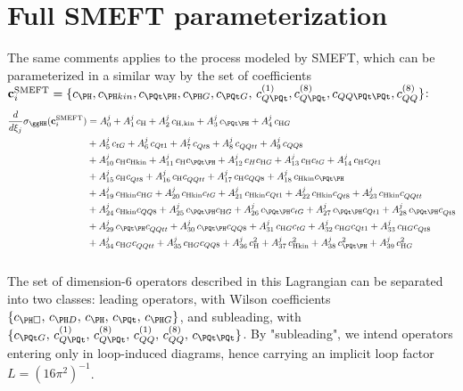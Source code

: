 \section{Full SMEFT parameterization}
\label{sec:appendix_smeft_parameterization}

The same comments applies to the \ggHH process modeled by SMEFT, which can be parameterized in a similar way by the set of coefficients $\mathbf{c}^{\text{SMEFT}}_i=\{c_\PH,c_{\PH kin},c_{\PQt\PH}, c_{\PH G},  c_{\PQt G},\,c_{Q\PQt}^{(1)},c_{Q\PQt}^{(8)},c_{QQ\PQt\PQt},c_{QQ}^{(8)}\}$:
\begin{align}\label{smeftparams}
\notag\frac{d}{d\xi_j}\sigma_{\ggHH}(\mathbf{c}^{\text{SMEFT}}_i)&= A^j_0 + A^j_1\,c_{\text{H}} + A^j_2\,c_{\text{H},\mathrm{kin}} + A^j_3\,c_{\PQt\PH} + A^j_4\,c_{\text{H}G}\\\notag
& + A^j_5\,c_{tG} + A^j_6\,c_{Qt1} + A^j_7\,c_{Qt8}^{} + A^j_8\,c_{QQtt}^{} + A^j_9\,c_{QQ8}\\\notag
& + A^j_{10}\,c_\text{H} c_{\text{H}\mathrm{kin}} + A^j_{11}\,c_\text{H} c_{\PQt\PH} + A^j_{12}\,c_H c_{\text{H}G} + A^j_{13}\,c_\text{H} c_{tG} + A^j_{14}\,c_\text{H} c_{Qt1}\\
& + A^j_{15}\,c_\text{H} c_{Qt8}^{} + A^j_{16}\,c_\text{H} c_{QQtt}^{} + A^j_{17}\,c_\text{H} c_{QQ8} + A^j_{18}\,c_{\text{H}\mathrm{kin}} c_{\PQt\PH}\\\notag
& + A^j_{19}\,c_{\text{H}\mathrm{kin}} c_{\text{H}G} + A^j_{20}\,c_{\text{H}\mathrm{kin}} c_{tG} + A^j_{21}\,c_{\text{H}\mathrm{kin}} c_{Qt1} + A^j_{22}\,c_{\text{H}\mathrm{kin}} c_{Qt8}^{} + A^j_{23}\,c_{\text{H}\mathrm{kin}} c_{QQtt}^{}\\\notag
& + A^j_{24}\,c_{\text{H}\mathrm{kin}} c_{QQ8} + A^j_{25}\,c_{\PQt\PH} c_{\text{H}G} + A^j_{26}\,c_{\PQt\PH} c_{tG} + A^j_{27}\,c_{\PQt\PH} c_{Qt1} + A^j_{28}\,c_{\PQt\PH} c_{Qt8}^{}\\\notag
& + A^j_{29}\,c_{\PQt\PH} c_{QQtt}^{} + A^j_{30}\,c_{\PQt\PH} c_{QQ8} + A^j_{31}\,c_{\text{H}G} c_{tG} + A^j_{32}\,c_{\text{H}G} c_{Qt1} + A^j_{33}\,c_{\text{H}G} c_{Qt8}^{}\\\notag
& + A^j_{34}\,c_{\text{H}G} c_{QQtt}^{} + A^j_{35}\,c_{\text{H}G} c_{QQ8} + A^j_{36}\,c_\text{H}^2 + A^j_{37}\,c_{\text{H}\mathrm{kin}}^2 + A^j_{38}\,c_{\PQt\PH}^2 + A^j_{39}\,c_{\text{H}G}^2 \\\notag
    \label{eq:smeftpara}
\end{align}
The set of dimension-6 operators described in this Lagrangian can be separated into two classes: leading operators, with Wilson coefficients $\{c_{\PH\Box},\,c_{\PH D},\,c_\PH,\,c_{\PQt},\,c_{\PH G}\}$, and subleading, with $\{c_{\PQt G},\,c_{Q\PQt}^{(1)},\,c_{Q\PQt}^{(8)},\,c_{QQ}^{(1)},\,c_{QQ}^{(8)},\,c_{\PQt\PQt}\}$. By "subleading", we intend operators entering only in loop-induced diagrams, hence carrying an implicit loop factor $L=(16\pi^2)^{-1}$. 

